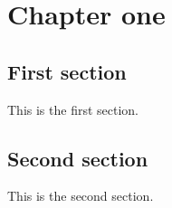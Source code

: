 \documentclass{book}
\begin{document}
\chapter{Chapter one}

\section{First section}
This is the first section.

\section{Second section}
This is the second section.
\end{document}
